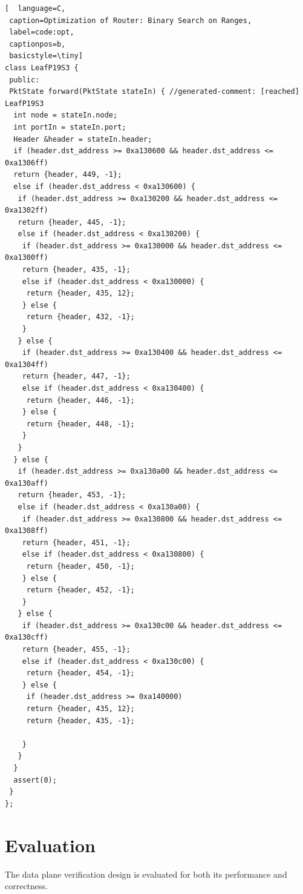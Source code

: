 \documentclass[letterpaper, 10 pt, conference]{ieeeconf}  %
\begin{document}
\begin{lstlisting}[  language=C,
 caption=Optimization of Router: Binary Search on Ranges,
 label=code:opt,
 captionpos=b,
 basicstyle=\tiny]
class LeafP19S3 {
 public:
 PktState forward(PktState stateIn) { //generated-comment: [reached] LeafP19S3
  int node = stateIn.node;
  int portIn = stateIn.port;
  Header &header = stateIn.header;
  if (header.dst_address >= 0xa130600 && header.dst_address <= 0xa1306ff)
  return {header, 449, -1};
  else if (header.dst_address < 0xa130600) {
   if (header.dst_address >= 0xa130200 && header.dst_address <= 0xa1302ff)
   return {header, 445, -1};
   else if (header.dst_address < 0xa130200) {
    if (header.dst_address >= 0xa130000 && header.dst_address <= 0xa1300ff)
    return {header, 435, -1};
    else if (header.dst_address < 0xa130000) {
     return {header, 435, 12};
    } else {
     return {header, 432, -1};
    }
   } else {
    if (header.dst_address >= 0xa130400 && header.dst_address <= 0xa1304ff)
    return {header, 447, -1};
    else if (header.dst_address < 0xa130400) {
     return {header, 446, -1};
    } else {
     return {header, 448, -1};
    }
   }
  } else {
   if (header.dst_address >= 0xa130a00 && header.dst_address <= 0xa130aff)
   return {header, 453, -1};
   else if (header.dst_address < 0xa130a00) {
    if (header.dst_address >= 0xa130800 && header.dst_address <= 0xa1308ff)
    return {header, 451, -1};
    else if (header.dst_address < 0xa130800) {
     return {header, 450, -1};
    } else {
     return {header, 452, -1};
    }
   } else {
    if (header.dst_address >= 0xa130c00 && header.dst_address <= 0xa130cff)
    return {header, 455, -1};
    else if (header.dst_address < 0xa130c00) {
     return {header, 454, -1};
    } else {
     if (header.dst_address >= 0xa140000)
     return {header, 435, 12};
     return {header, 435, -1};
     
    }
   }
  }
  assert(0);
 }
};

\end{lstlisting}
\section{Evaluation}\label{sec:eval}
The data plane verification design is evaluated for both its performance and correctness.
\end{document}
